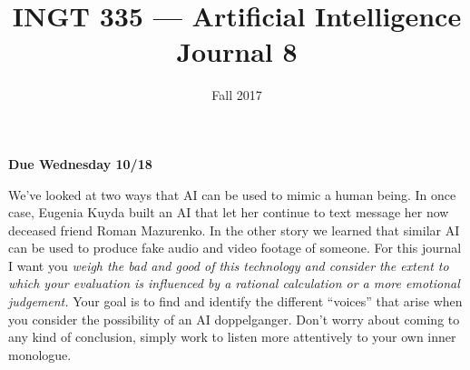 \documentclass[nobib]{tufte-handout}
\title{INGT 335 --- Artificial Intelligence \\ Journal 8}
\author{}
\date{ Fall 2017 }
\begin{document}
\maketitle

\begin{center}
  \textbf{Due Wednesday 10/18}
\end{center}

We've looked at two ways that AI can be used to mimic a human being. In once case, Eugenia Kuyda built an AI that let her continue to text message her now deceased friend Roman Mazurenko.  In the other story we learned that similar AI can be used to produce fake audio and video footage of someone. For this journal I want you \textit{weigh the bad and good of this technology and consider the extent to which your evaluation is influenced by a rational calculation or a more emotional judgement.}  Your goal is to find and identify the different ``voices'' that arise when you consider the possibility of an AI doppelganger.  Don't worry about coming to any kind of conclusion, simply work to listen more attentively to your own inner monologue.
\end{document}
